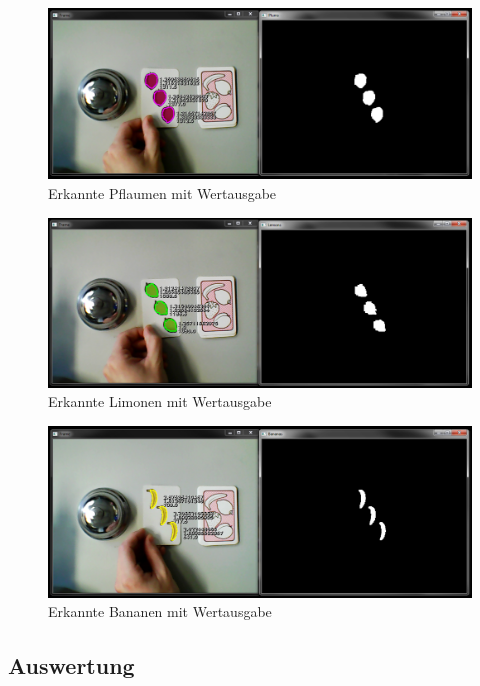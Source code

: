 \begin{figure}[H]
    \centering
    \includegraphics[width=\textwidth]{Abbildungen/Pflaumen03}
    \caption[ ]{Erkannte Pflaumen mit Wertausgabe}
    \label{fig:Pflaumen03}
\end{figure}
\begin{figure}[H]
    \centering
    \includegraphics[width=\textwidth]{Abbildungen/Limetten03}
    \caption[ ]{Erkannte Limonen mit Wertausgabe}
    \label{fig:Limetten03}
\end{figure}
\begin{figure}[H]
    \centering
    \includegraphics[width=\textwidth]{Abbildungen/Bananen03}
    \caption[ ]{Erkannte Bananen mit Wertausgabe}
    \label{fig:Bananen03}
\end{figure}

\subsection{Auswertung}

